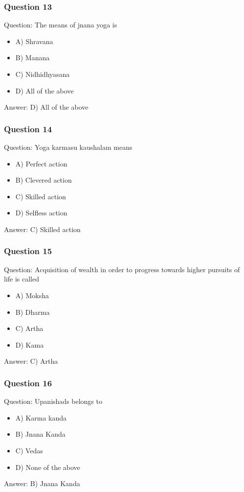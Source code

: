 \begin{frame}[fragile]\frametitle{Question 13}
Question: The means of jnana yoga is
\begin{itemize}
\item A) Shravana
\item B) Manana
\item C) Nidhidhyasana
\item D) All of the above
\end{itemize}
Answer: D) All of the above
\end{frame}

\begin{frame}[fragile]\frametitle{Question 14}
Question: Yoga karmasu kaushalam means
\begin{itemize}
\item A) Perfect action
\item B) Clevered action
\item C) Skilled action
\item D) Selfless action
\end{itemize}
Answer: C) Skilled action
\end{frame}

\begin{frame}[fragile]\frametitle{Question 15}
Question: Acquisition of wealth in order to progress towards higher pursuits of life is called
\begin{itemize}
\item A) Moksha
\item B) Dharma
\item C) Artha
\item D) Kama
\end{itemize}
Answer: C) Artha
\end{frame}


\begin{frame}[fragile]\frametitle{Question 16}
Question: Upanishads belongs to
\begin{itemize}
\item A) Karma kanda
\item B) Jnana Kanda
\item C) Vedas
\item D) None of the above
\end{itemize}
Answer: B) Jnana Kanda
\end{frame}

